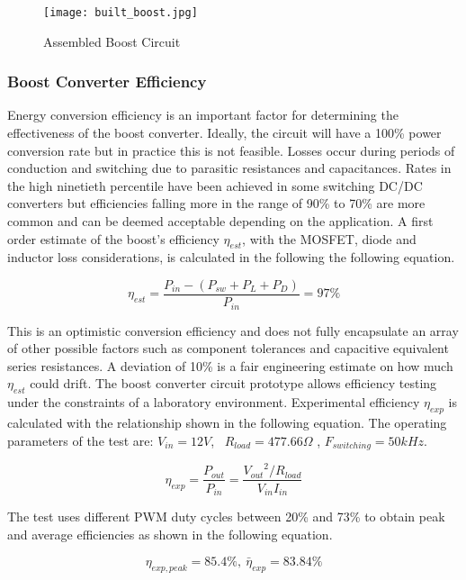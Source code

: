 \begin{figure}
\centering
\texttt{[image: built\_boost.jpg]}
\caption{Assembled Boost Circuit}
\label{Built Boost}
\end{figure}

\subsubsection{Boost Converter Efficiency}
Energy conversion efficiency is an important factor for determining the effectiveness of the boost converter. Ideally, the circuit will have a 100\% power conversion rate but in practice this is not feasible. Losses occur during periods of conduction and switching due to parasitic resistances and capacitances.  Rates in the high ninetieth percentile have been achieved in some switching DC/DC converters but efficiencies falling more in the range of 90\% to 70\% are more common and can be deemed acceptable depending on the application. A first order estimate of the boost's efficiency $\eta_{est}$, with the MOSFET, diode and inductor loss considerations, is calculated in the following the following equation.

\begin{equation}
\eta_{est} = \frac{P_{in} - {(P_{sw}+P_L+P_D)}}{P_{in}} = 97\%
\end{equation}


This is an optimistic conversion efficiency and does not fully encapsulate an array of other possible factors such as component tolerances and capacitive equivalent series resistances. A deviation of 10\% is a fair engineering estimate on how much $\eta_{est}$ could drift. The boost converter circuit prototype allows efficiency testing under the constraints of a laboratory environment. Experimental efficiency $\eta_{exp}$ is calculated with the relationship shown in the following equation. The operating parameters of the test are: $V_{in} = 12V$,~ $R_{load} = 477.66\Omega$ , $F_{switching} = 50 kHz$. 

\begin{equation}
\eta_{exp} = \frac{P_{out}}{P_{in}} = \frac{{V_{out}}^2/{R_{load}}}{{V_{in}}{I_{in}}}
\end{equation}

The test uses different PWM duty cycles between 20\% and 73\% to obtain peak and average efficiencies as shown in the following equation.

\begin{equation}
\eta_{exp,peak} = 85.4\%, ~ \bar{\eta}_{exp} = 83.84\% 
\end{equation}



